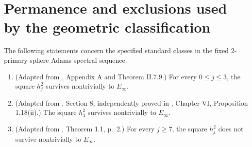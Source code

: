 \section{Permanence and exclusions used by the geometric classification}
\begin{theorem}
\label{frontier:Literature:552cd6818d8d}
The following statements concern the specified standard classes in the fixed
$2$-primary sphere Adams spectral sequence.
\begin{enumerate}
\item (Adapted from \cite{MayThesis1964}, Appendix A and Theorem II.7.9.)
For every $0\leq j\leq3$, the square $h_j^2$ survives nontrivially to $E_\infty$.
\item (Adapted from \cite{MahowaldTangora}, Section 8; independently proved in
\cite{BMMS1986}, Chapter VI, Proposition 1.18(ii).)
The square $h_4^2$ survives nontrivially to $E_\infty$.
\item (Adapted from \cite{HHR}, Theorem 1.1, p.~2.)
For every $j\geq7$, the square $h_j^2$ does not survive nontrivially to $E_\infty$.
\end{enumerate}
\end{theorem}

